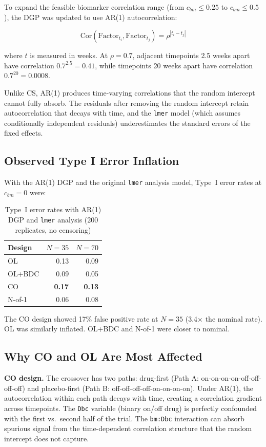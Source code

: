 \documentclass[11pt]{article}
\begin{document}
To expand the feasible biomarker correlation range (from
$c_{bm} \leq 0.25$ to $c_{bm} \leq 0.5$), the DGP was
updated to use AR(1) autocorrelation:

\[
\text{Cor}(\text{Factor}_{t_i}, \text{Factor}_{t_j}) =
\rho^{|t_i - t_j|}
\]

where $t$ is measured in weeks. At $\rho = 0.7$, adjacent
timepoints 2.5 weeks apart have correlation
$0.7^{2.5} = 0.41$, while timepoints 20 weeks apart have
correlation $0.7^{20} = 0.0008$.

Unlike CS, AR(1) produces time-varying correlations that the
random intercept cannot fully absorb. The residuals after
removing the random intercept retain autocorrelation that
decays with time, and the \texttt{lmer} model (which assumes
conditionally independent residuals) underestimates the
standard errors of the fixed effects.

\subsection{Observed Type I Error Inflation}

With the AR(1) DGP and the original \texttt{lmer} analysis
model, Type~I error rates at $c_{bm} = 0$ were:

\begin{table}[h]
\centering
\caption{Type~I error rates with AR(1) DGP and \texttt{lmer}
  analysis (200 replicates, no censoring)}
\begin{tabular}{lrr}
\toprule
Design & $N = 35$ & $N = 70$ \\
\midrule
OL & 0.13 & 0.09 \\
OL+BDC & 0.09 & 0.05 \\
CO & \textbf{0.17} & \textbf{0.13} \\
N-of-1 & 0.06 & 0.08 \\
\bottomrule
\end{tabular}
\end{table}

The CO design showed 17\% false positive rate at $N = 35$
(3.4$\times$ the nominal rate). OL was similarly inflated.
OL+BDC and N-of-1 were closer to nominal.

\subsection{Why CO and OL Are Most Affected}

\textbf{CO design.} The crossover has two paths: drug-first
(Path A: on-on-on-on-off-off-off-off) and placebo-first
(Path B: off-off-off-off-on-on-on-on). Under AR(1), the
autocorrelation within each path decays with time, creating
a correlation gradient across timepoints. The \texttt{Dbc}
variable (binary on/off drug) is perfectly confounded with
the first vs.\ second half of the trial. The \texttt{bm:Dbc}
interaction can absorb spurious signal from the time-dependent
correlation structure that the random intercept does not
capture.
\end{document}
